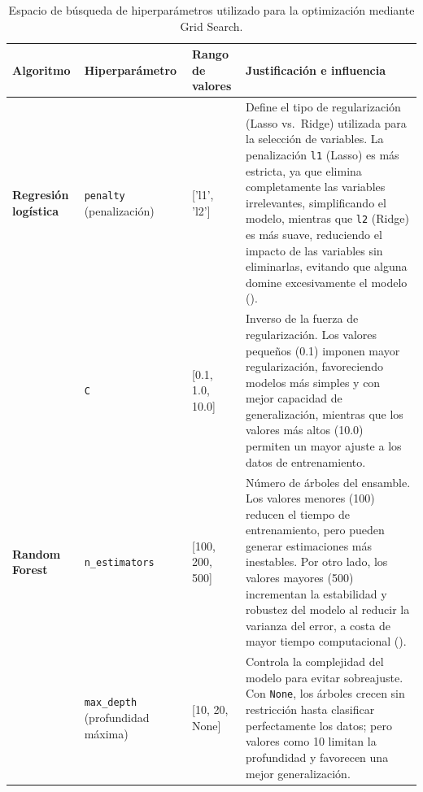 \begin{table}[htbp]
\centering
\footnotesize
\setlength{\tabcolsep}{4pt}
\renewcommand{\arraystretch}{1.15}
\caption{Espacio de búsqueda de hiperparámetros utilizado para la optimización mediante Grid Search.}
\label{tab:hiperparametros}
\begin{tabular}{|l|l|l|l|}
\hline
\parbox[t]{2.5cm}{\textbf{Algoritmo}} & \parbox[t]{3.0cm}{\textbf{Hiperparámetro}} & \parbox[t]{2.5cm}{\textbf{Rango de valores}} & \parbox[t]{7.0cm}{\textbf{Justificación e influencia}} \\ \hline

\parbox[t]{2.5cm}{\textbf{Regresión logística}} & \parbox[t]{3.0cm}{\texttt{penalty} (penalización)} & \parbox[t]{2.5cm}{['l1', 'l2']} & \parbox[t]{7.0cm}{Define el tipo de regularización (Lasso vs.\ Ridge) utilizada para la selección de variables. La penalización \texttt{l1} (Lasso) es más estricta, ya que elimina completamente las variables irrelevantes, simplificando el modelo, mientras que \texttt{l2} (Ridge) es más suave, reduciendo el impacto de las variables sin eliminarlas, evitando que alguna domine excesivamente el modelo (\cite{hastie2009elements}).} \\ \hline

\parbox[t]{2.5cm}{} & \parbox[t]{3.0cm}{\texttt{C}} & \parbox[t]{2.5cm}{[0.1, 1.0, 10.0]} & \parbox[t]{7.0cm}{Inverso de la fuerza de regularización. Los valores pequeños (0.1) imponen mayor regularización, favoreciendo modelos más simples y con mejor capacidad de generalización, mientras que los valores más altos (10.0) permiten un mayor ajuste a los datos de entrenamiento.} \\ \hline

\parbox[t]{2.5cm}{\textbf{Random Forest}} & \parbox[t]{3.0cm}{\texttt{n\_estimators}} & \parbox[t]{2.5cm}{[100, 200, 500]} & \parbox[t]{7.0cm}{Número de árboles del ensamble. Los valores menores (100) reducen el tiempo de entrenamiento, pero pueden generar estimaciones más inestables. Por otro lado, los valores mayores (500) incrementan la estabilidad y robustez del modelo al reducir la varianza del error, a costa de mayor tiempo computacional (\cite{probst2019rf}).} \\ \hline

\parbox[t]{2.5cm}{} & \parbox[t]{3.0cm}{\texttt{max\_depth} (profundidad máxima)} & \parbox[t]{2.5cm}{[10, 20, None]} & \parbox[t]{7.0cm}{Controla la complejidad del modelo para evitar sobreajuste. Con \texttt{None}, los árboles crecen sin restricción hasta clasificar perfectamente los datos; pero valores como 10 limitan la profundidad y favorecen una mejor generalización.} \\ \hline


\end{tabular}
\end{table}
